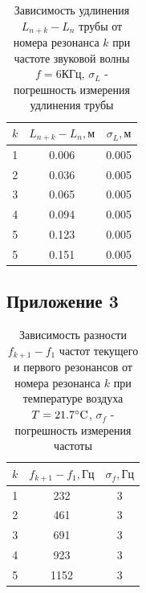 \begin{table}[h]
    \centering
    \begin{tabular}{|c|c|c|}
    \hline
    $k$ & $L_{n+k} - L_n, \text{м}$ & $\sigma_L, \text{м}$  \\ \hline
    1   & 0.006                     & 0.005  \\ \hline
    2   & 0.036                     & 0.005  \\ \hline
    3   & 0.065                     & 0.005  \\ \hline
    4   & 0.094                     & 0.005  \\ \hline
    5   & 0.123                     & 0.005  \\ \hline
    5   & 0.151                     & 0.005  \\ \hline
\end{tabular}
    \caption{Зависимость удлинения $L_{n+k} - L_n$ трубы от номера резонанса $k$ при частоте звуковой волны $f = 6\text{КГц}$, $\sigma_L$ - погрешность измерения удлинения трубы}
    \label{tab:t5}
\end{table}
\newpage
\subsection{Приложение 3} \label{Приложение 3}

\begin{table}[h]
    \centering
    \begin{tabular}{|c|c|c|}
    \hline
    $k$ & $f_{k+1} - f_1, \text{Гц}$ & $\sigma_f, \text{Гц}$  \\ \hline
    1   & 232                        & 3  \\ \hline
    2   & 461                        & 3  \\ \hline
    3   & 691                        & 3  \\ \hline
    4   & 923                        & 3  \\ \hline
    5   & 1152                       & 3  \\ \hline
\end{tabular}
    \caption{Зависимость разности $f_{k+1} - f_1$ частот текущего и первого резонансов от номера резонанса $k$ при температуре воздуха $T = 21.7\celsius$, $\sigma_f$ - погрешность измерения частоты}
    \label{tab:t6}
\end{table}

